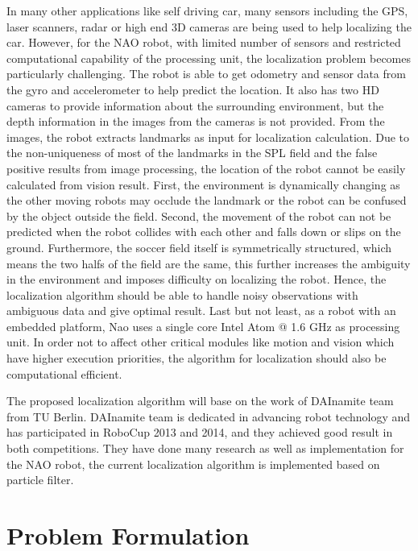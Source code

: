 In many other applications like self driving car, many sensors including the GPS, laser scanners, radar or high end 3D cameras are being used to help localizing the car. 
However, for the NAO robot, with limited number of sensors and restricted computational capability of the processing unit, the localization problem becomes particularly challenging. The robot is able to get odometry and sensor data from the gyro and accelerometer to help predict the location. It also has two HD cameras to provide information about the surrounding environment, but the depth information in the images from the cameras is not provided. From the images, the robot
extracts landmarks as input for localization calculation. Due to the non-uniqueness of most of the landmarks in the \gls{SPL} field and the false positive results from image processing, 
the location of the robot cannot be easily calculated from vision result. First, the environment is dynamically changing as the other moving robots may occlude the landmark or the robot can be confused 
by the object outside the field. Second, the movement of the robot can not be predicted when the robot collides with each other and falls down or slips on the ground. Furthermore, the soccer field itself is symmetrically structured, which means the two halfs of the field are the same, this further increases the ambiguity in the environment 
and imposes difficulty on localizing the robot. Hence, the localization algorithm should be able to 
handle noisy observations with ambiguous data and give optimal result. Last but not least, as a robot with an embedded platform, Nao uses a single core Intel Atom @ 1.6 GHz as processing unit. 
In order not to affect other critical modules like motion and vision which have higher execution priorities, the algorithm for localization should also be computational efficient.

The proposed localization algorithm will base on the work of DAInamite team from TU Berlin. DAInamite team is dedicated in advancing robot technology and has participated in RoboCup 2013 and 2014, and they achieved good result in both competitions.  They have done many research as well as implementation for the NAO robot, the current localization algorithm is implemented based on particle filter.
 
\section{Problem Formulation}

